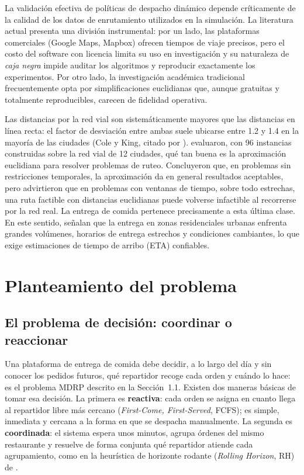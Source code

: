\documentclass[12pt,letterpaper,oneside]{book}
\begin{document}
La validación efectiva de políticas de despacho dinámico depende críticamente de la calidad de los datos de 
enrutamiento utilizados en la simulación. La literatura actual presenta una división instrumental: por un lado, las 
plataformas comerciales (Google Maps, Mapbox) ofrecen tiempos de viaje precisos, pero el costo del software
con licencia limita su uso en investigación \citep{Pereira2021} y su naturaleza de \textit{caja negra} impide
auditar los algoritmos y reproducir exactamente los experimentos. Por otro lado,
la investigación académica tradicional frecuentemente opta por simplificaciones euclidianas que, aunque 
gratuitas y totalmente reproducibles, carecen de fidelidad operativa.

Las distancias por la red vial son sistemáticamente mayores que las distancias en línea recta: el factor
de desviación entre ambas suele ubicarse entre 1.2 y 1.4 en la mayoría de las ciudades (Cole y King, citado
por \citet{Boyaci2021}). \citet{Boyaci2021} evaluaron, con 96 instancias construidas sobre la red vial de
12 ciudades, qué tan buena es la aproximación euclidiana para resolver problemas de ruteo. Concluyeron que,
en problemas sin restricciones temporales, la aproximación da en general resultados aceptables, pero
advirtieron que en problemas con ventanas de tiempo, sobre todo estrechas, una ruta factible con distancias
euclidianas puede volverse infactible al recorrerse por la red real. La entrega de comida pertenece
precisamente a esta última clase. En este sentido, \citet{Jazemi2023} señalan que la entrega en zonas
residenciales urbanas enfrenta grandes volúmenes, horarios de entrega estrechos y condiciones cambiantes,
lo que exige estimaciones de tiempo de arribo (ETA) confiables.

\section{Planteamiento del problema}
\label{sec:planteamiento}

\subsection{El problema de decisión: coordinar o reaccionar}
Una plataforma de entrega de comida debe decidir, a lo largo del día y sin conocer los pedidos
futuros, qué repartidor recoge cada orden y cuándo lo hace: es el problema MDRP descrito en la
Sección~1.1.  Existen dos maneras básicas de tomar esa decisión.  La primera es
\textbf{reactiva}: cada orden se asigna en cuanto llega al repartidor libre más cercano
(\textit{First-Come, First-Served}, FCFS); es simple, inmediata y cercana a la forma en que se
despacha manualmente.  La segunda es \textbf{coordinada}: el sistema espera unos minutos, agrupa
órdenes del mismo restaurante y resuelve de forma conjunta qué repartidor atiende cada
agrupamiento, como en la heurística de horizonte rodante (\textit{Rolling Horizon}, RH) de
\citet{Reyes2018}.
\end{document}
